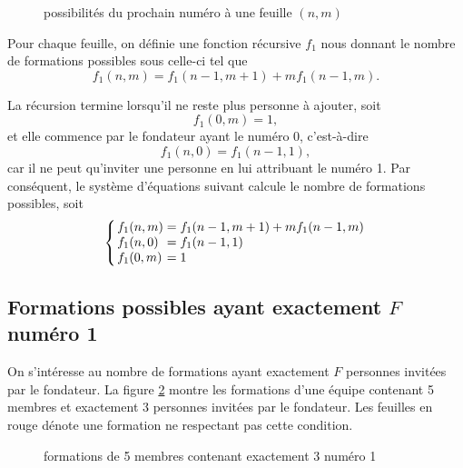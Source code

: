 \documentclass[11pt]{article}
\begin{document}
\begin{figure}[H]
    \centering
    
    \caption{possibilités du prochain numéro à une feuille $(n,m)$}
    \label{fig:arbre_feuille}
\end{figure}

Pour chaque feuille, on définie une fonction récursive $f_1$ nous donnant le
nombre de formations possibles sous celle-ci tel que
\begin{equation*}
    f_1(n,m)=f_1(n-1,m+1)+mf_1(n-1,m).
\end{equation*}

La récursion termine lorsqu'il ne reste plus personne à ajouter, soit
\begin{equation*}
    f_1(0,m)=1,
\end{equation*}
et elle commence par le fondateur ayant le numéro 0, c'est-à-dire
\begin{equation*}
    f_1(n,0)=f_1(n-1,1),
\end{equation*}
car il ne peut qu'inviter une personne en lui attribuant le numéro 1. Par
conséquent, le système d'équations suivant calcule le nombre de formations
possibles, soit
\begin{equation}\label{eq:f1}
    \arraycolsep=1.4pt\def\arraystretch{1}
    \left\{
        \begin{array}{lcl}
            f_1(n,m)&=&f_1(n-1,m+1)+mf_1(n-1,m)\\
            f_1(n,0)&=&f_1(n-1,1)\\
            f_1(0,m)&=&1\\
        \end{array}
    \right.
\end{equation}

\subsection{Formations possibles ayant exactement $F$ numéro 1}
On s'intéresse au nombre de formations ayant exactement $F$ personnes
invitées par le fondateur. La figure \ref{fig:arbre_comb_1} montre
les formations d'une équipe contenant 5 membres et exactement 3
personnes invitées par le fondateur. Les feuilles en rouge dénote
une formation ne respectant pas cette condition.

\begin{figure}[H]
    \centering
    
    \caption{formations de 5 membres contenant exactement 3 numéro 1}
    \label{fig:arbre_comb_1}
\end{figure}
\end{document}
